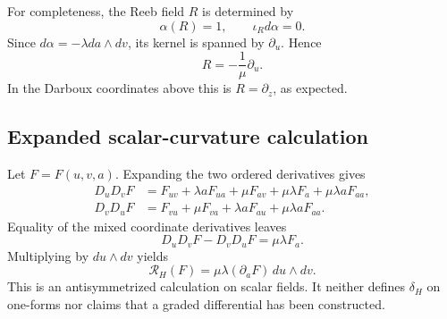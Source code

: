 For completeness, the Reeb field \(R\) is determined by
\[
    \alpha(R)=1,
    \qquad
    \iota_Rd\alpha=0.
\]
Since \(d\alpha=-\lambda da\wedge dv\), its kernel is spanned by
\(\partial_u\).  Hence
\[
    R=-\frac1\mu\partial_u.
\]
In the Darboux coordinates above this is \(R=\partial_z\), as expected.

\subsection{Expanded scalar-curvature calculation}

Let \(F=F(u,v,a)\).  Expanding the two ordered derivatives gives
\begin{align*}
    D_uD_vF
       &=F_{uv}+\lambda aF_{ua}+\mu F_{av}
         +\mu\lambda F_a+\mu\lambda aF_{aa},\\
    D_vD_uF
       &=F_{vu}+\mu F_{va}+\lambda aF_{au}
         +\mu\lambda aF_{aa}.
\end{align*}
Equality of the mixed coordinate derivatives leaves
\[
    D_uD_vF-D_vD_uF=\mu\lambda F_a.
\]
Multiplying by \(du\wedge dv\) yields
\[
    \mathcal R_H(F)
       =\mu\lambda(\partial_aF)\,du\wedge dv.
\]
This is an antisymmetrized calculation on scalar fields.  It neither defines
\(\delta_H\) on one-forms nor claims that a graded differential has been
constructed.
